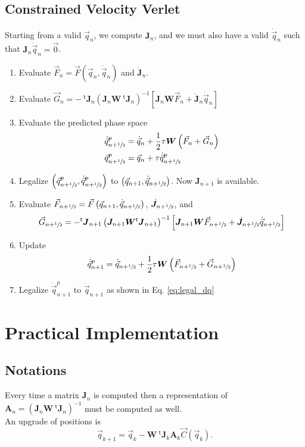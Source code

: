 \documentclass[aps,twocolumn]{revtex4}
\newcommand{\mymat}[1]{\boldsymbol{#1}}
\newcommand{\mytrn}[1]{{\!\!~^{\mathsf{t}}{#1}}}
\newcommand{\half}{\sfrac{1}{2}}
\newcommand{\q}{\vec{q}}
\newcommand{\dq}{\dot{\q}}
\newcommand{\C}{\vec{C}}
\newcommand{\J}{\mymat{J}}
\newcommand{\dJ}{\dot{\J}}
\newcommand{\tJ}{\mytrn{\J}}
\newcommand{\G}{\vec{G}}
\newcommand{\W}{\mymat{W}}
\newcommand{\A}{\mymat{A}}
\begin{document}
\subsection{Constrained Velocity Verlet}

Starting from a valid $\q_n$, we compute $\J_n$, and we must also have a valid $\dq_n$ such that $\J_n\dq_n=\vec{0}$.

\begin{enumerate}
	\item Evaluate $\vec{F}_n = \vec{F}(\q_n,\dq_n)$ and $\dJ_n$.
	\item Evaluate $\G_n = -\tJ_n \left(\J_n \W \tJ_n \right)^{-1}\left\lbrack \J_n\W\vec{F}_n + \dJ_n \dq_n \right\rbrack$
	\item Evaluate the predicted phase space
	\begin{align*}
	\dq_{n+\half}^p & = \dq_n + \frac{1}{2} \tau \W \left(\vec{F}_n + \G_n \right) \\
	\q_{n+\half}^p  & = \q_{n} + \tau \dq_{n+\half}^p
	\end{align*}
	\item Legalize $\left(\q_{n+\half}^p,\dq_{n+\half}^p\right)$ to $\left(\q_{n+1},\dq_{n+\half}\right)$. Now $\J_{n+1}$ is available.
	\item Evaluate $\vec{F}_{n+\half}=\vec{F}\left(\q_{n+1},\dq_{n+\half}\right)$, $\dJ_{n+\half}$, 
	and 
	$$
	\G_{n+\half}=-\tJ_{n+1} \left(\J_{n+1} \W \tJ_{n+1} \right)^{-1}\left\lbrack \J_{n+1}\W\vec{F}_{n+\half} + \dJ_{n+\half} \dq_{n+\half} \right\rbrack
	$$
	\item Update
	$$
		\dq_{n+1}^{p} = \dq_{n+\half} + \frac{1}{2} \tau \W\left(\vec{F}_{n+\half} + \vec{G}_{n+\half}\right)
	$$
	\item Legalize $\dq_{n+1}^{p}$ to $\dq_{n+1}$ as shown in Eq. \eqref{eq:legal_dq}
\end{enumerate}

\section{Practical Implementation}

\subsection{Notations}
Every time a matrix $\J_n$ is computed then  a representation of $\A_n = \left(\J_n \W\tJ_n\right)^{-1}$
must be computed as well.\\

An upgrade of positions is
$$
	\q_{k+1} = \q_{k} - \W \tJ_k  \A_{k} \C\left(\q_{k}\right).
$$
\end{document}
